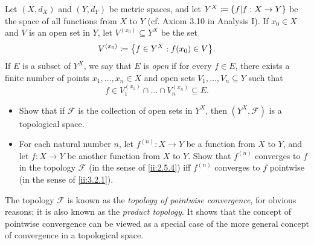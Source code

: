 \begin{ex}\label{ii:ex:3.4.4}
  Let \((X, d_X)\) and \((Y, d_Y)\) be metric spaces, and let \(Y^X \coloneqq \left\lbrace f | f : X \to Y \right\rbrace\) be the space of all functions from \(X\) to \(Y\)
  (cf. Axiom 3.10 in Analysis I).
  If \(x_0 \in X\) and \(V\) is an open set in \(Y\), let \(V^{(x_0)} \subseteq Y^X\) be the set
  \[
    V^{(x_0)} \coloneqq \set{f \in Y^X : f(x_0) \in V}.
  \]
  If \(E\) is a subset of \(Y^X\), we say that \(E\) is \emph{open} if for every \(f \in E\), there exists a finite number of points \(x_1, \dots, x_n \in X\) and open sets \(V_1, \dots, V_n \subseteq Y\) such that
  \[
    f \in V_1^{(x_1)} \cap \dots \cap V_n^{(x_n)} \subseteq E.
  \]
  \begin{itemize}
    \item Show that if \(\mathcal{F}\) is the collection of open sets in \(Y^X\), then \((Y^X , \mathcal{F})\) is a topological space.
    \item For each natural number \(n\), let \(f^{(n)} : X \to Y\) be a function from \(X\) to \(Y\), and let \(f : X \to Y\) be another function from \(X\) to \(Y\).
          Show that \(f^{(n)}\) converges to \(f\) in the topology \(\mathcal{F}\) (in the sense of \cref{ii:2.5.4}) iff \(f^{(n)}\) converges to \(f\) pointwise (in the sense of \cref{ii:3.2.1}).
  \end{itemize}
  The topology \(\mathcal{F}\) is known as the \emph{topology of pointwise convergence}, for obvious reasons;
  it is also known as the \emph{product topology}.
  It shows that the concept of pointwise convergence can be viewed as a special case of the more general concept of convergence in a topological space.
\end{ex}

